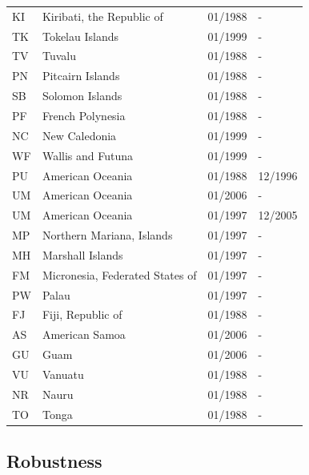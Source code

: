 \begin{scriptsize}
\begin{longtable}{lp{8cm}p{2cm}p{2cm}}
	KI & Kiribati, the Republic of       & 01/1988 & -  \\
	TK & Tokelau Islands                 & 01/1999 & -  \\
	TV & Tuvalu                          & 01/1988 & -  \\
	PN & Pitcairn Islands                & 01/1988 & -  \\
	SB & Solomon Islands                 & 01/1988 & -  \\
	PF & French Polynesia                & 01/1988 & -  \\
	NC & New Caledonia                   & 01/1999 & -  \\
	WF & Wallis and Futuna               & 01/1999 & -  \\
	PU & American Oceania                & 01/1988 & 12/1996  \\
	UM & American Oceania                & 01/2006 & -  \\
	UM & American Oceania                & 01/1997 & 12/2005  \\
	MP & Northern Mariana, Islands       & 01/1997 & -  \\
	MH & Marshall Islands                & 01/1997 & -  \\
	FM & Micronesia, Federated States of & 01/1997 & -  \\
	PW & Palau                           & 01/1997 & -  \\
	FJ & Fiji, Republic of               & 01/1988 & -  \\
	AS & American Samoa                  & 01/2006 & -  \\
	GU & Guam                            & 01/2006 & -  \\
	VU & Vanuatu                         & 01/1988 & -  \\
	NR & Nauru                           & 01/1988 & -  \\
	TO & Tonga                           & 01/1988 & -  \\
\end{longtable}
\end{scriptsize}


\subsection{Robustness}
\label{sec:robust}


